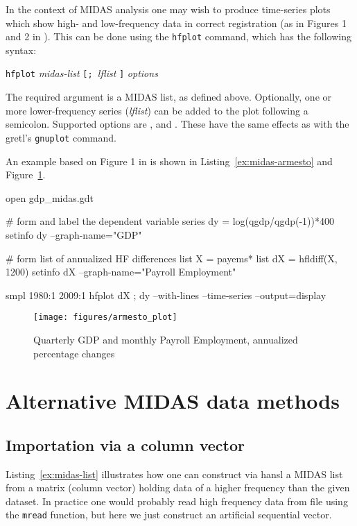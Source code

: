 In the context of MIDAS analysis one may wish to produce time-series
plots which show high- and low-frequency data in correct registration
(as in Figures 1 and 2 in \citealp{armesto10}).  This can be done using
the \texttt{hfplot} command, which has the following syntax:

\texttt{hfplot} \textsl{midas-list} \texttt{[; }\textsl{lflist} 
\texttt{]} \textsl{options}

The required argument is a MIDAS list, as defined above. Optionally,
one or more lower-frequency series (\textsl{lflist}) can be added to
the plot following a semicolon. Supported options are
,  and . These
have the same effects as with the gretl's \texttt{gnuplot} command.

An example based on Figure 1 in \cite{armesto10} is shown in
Listing~\ref{ex:midas-armesto} and Figure~\ref{fig:armesto}.

\begin{script}[p]
\begin{scode}
open gdp_midas.gdt

# form and label the dependent variable
series dy = log(qgdp/qgdp(-1))*400
setinfo dy --graph-name="GDP"

# form list of annualized HF differences
list X = payems*
list dX = hfldiff(X, 1200)
setinfo dX --graph-name="Payroll Employment"

smpl 1980:1 2009:1
hfplot dX ; dy --with-lines --time-series --output=display
\end{scode}
\end{script}

\begin{figure}[p]
  \centering
  \texttt{[image: figures/armesto\_plot]}
  \caption{Quarterly GDP and monthly Payroll Employment,
  annualized percentage changes}
  \label{fig:armesto}
\end{figure}

\section{Alternative MIDAS data methods}
\label{sec:data-methods}

\subsection*{Importation via a column vector}

Listing~\ref{ex:midas-list} illustrates how one can construct via hansl a
MIDAS list from a matrix (column vector) holding data of a higher
frequency than the given dataset. In practice one would probably read
high frequency data from file using the \texttt{mread} function, but
here we just construct an artificial sequential vector.

